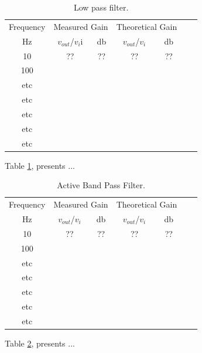\documentclass[journal]{IEEEtran}
\begin{document}
\begin{table}[!ht] %
\centering
\caption{Low pass filter.}
\begin{tabular}{ccccccc}
Frequency & \multicolumn{2}{l}{Measured Gain} & \multicolumn{2}{l}{Theoretical Gain} \\
Hz   & $v_{out}$/$v_i$i     & db     & $v_{out}$/$v_i$   & db           \\ \hline
10   & ??  &  ??           & ??   & ??       \\
100       &                                   &              &                                 &                              \\
etc &  &   &           &      \\                       
etc &  &   &           &      \\  
etc &  &   &           &      \\                       
etc &  &   &           &      \\  
etc &  &   &           &      
   
\end{tabular}
\label{table:Exps2}
\end{table}

Table \ref{table:Exps2}, presents ...\\[0.1in]

\begin{table}[!ht] %
\centering
\caption{Active Band Pass Filter.}
\begin{tabular}{ccccccc}
Frequency & \multicolumn{2}{l}{Measured Gain} & \multicolumn{2}{l}{Theoretical Gain} \\
Hz   & $v_{out}$/$v_i$  & db  & $v_{out}$/$v_i$   & db  \\ \hline
10  & ??   & ?? & ??   & ??       \\
100 &  &   &   &   \\
etc &  &   &   &      \\                       
etc &  &   &   &      \\                       
etc &  &   &   &      \\  
etc &  &   &   &      \\  
etc &  &   &   &      

\end{tabular}
\label{table:Exps3}
\end{table}

Table \ref{table:Exps3}, presents ...\\[0.05in]
\end{document}
